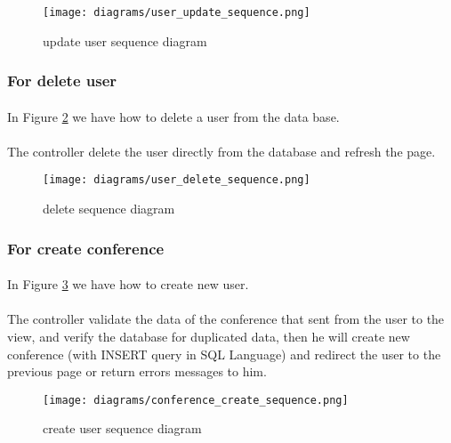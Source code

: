 		\begin{figure}[!ht]
			\centering
			\texttt{[image: diagrams/user\_update\_sequence.png]}
			\caption{update user sequence diagram}
			\label{fig:user-update-s-d}
		\end{figure}
	
	\subsubsection{For delete user}
	\paragraph{}
	In Figure \ref{fig:user-delete-s-d} we have how to delete a user from the data base.
	\paragraph{}
	The controller delete the user directly from the database and refresh the page.

		\begin{figure}[!ht]
			\centering
			\texttt{[image: diagrams/user\_delete\_sequence.png]}
			\caption{delete sequence diagram}
			\label{fig:user-delete-s-d}
		\end{figure}
	
	\subsubsection{For create conference}
	\paragraph{}
	In Figure \ref{fig:conference-create-s-d} we have how to create new user.
	\paragraph{}
	The controller validate the data of the conference that sent from the user to the view, and verify the database for duplicated data, then he will create new conference (with INSERT query in SQL Language) and redirect the user to the previous page or return errors messages to him.
	
		\begin{figure}[!ht]
			\centering
			\texttt{[image: diagrams/conference\_create\_sequence.png]}
			\caption{create user sequence diagram}
			\label{fig:conference-create-s-d}
		\end{figure}
	
